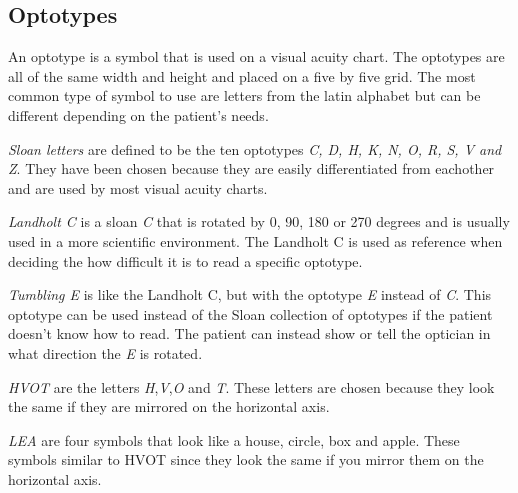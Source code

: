 \documentclass[12pt,a4paper,notitlepage]{report}
\begin{document}
\subsection{Optotypes} \label{Optotypes}
An optotype is a symbol that is used on a visual acuity chart. The optotypes are all of the same width and height and placed on a five by five grid. The most common type of symbol to use are letters from the latin alphabet but can be different depending on the patient's needs\cite{Colenbrander}.

\textit{Sloan letters} are defined to be the ten optotypes \textit{C, D, H, K, N, O, R, S, V and Z}. They have been chosen because they are easily differentiated from eachother \cite{Ferris} and are used by most visual acuity charts\cite{Colenbrander}.

\textit{Landholt C} is a sloan \textit{C} that is rotated by 0, 90, 180 or 270 degrees and is usually used in a more scientific environment. The Landholt C is used as reference when deciding the how difficult it is to read a specific optotype\cite{Colenbrander}.

\textit{Tumbling E} is like the Landholt C, but with the optotype \textit{E} instead of \textit{C}. This optotype can be used instead of the Sloan collection of optotypes if the patient doesn't know how to read. The patient can instead show or tell the optician in what direction the \textit{E} is rotated\cite{Colenbrander}.

\textit{HVOT} are the letters \textit{H},\textit{V},\textit{O} and \textit{T}. These letters are chosen because they look the same if they are mirrored on the horizontal axis.

\textit{LEA} are four symbols that look like a house, circle, box and apple. These symbols similar to HVOT since they look the same if you mirror them on the horizontal axis.
\end{document}
